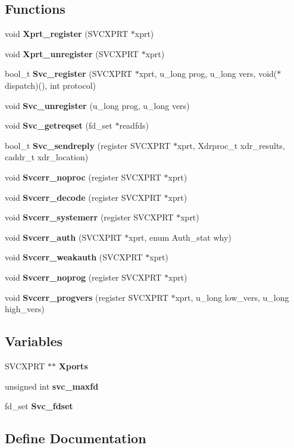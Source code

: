 \subsection*{Functions}
\begin{CompactItemize}
\item 
void {\bf Xprt\_\-register} (SVCXPRT $\ast$xprt)
\item 
void {\bf Xprt\_\-unregister} (SVCXPRT $\ast$xprt)
\item 
bool\_\-t {\bf Svc\_\-register} (SVCXPRT $\ast$xprt, u\_\-long prog, u\_\-long vers, void($\ast$dispatch)(), int protocol)
\item 
void {\bf Svc\_\-unregister} (u\_\-long prog, u\_\-long vers)
\item 
void {\bf Svc\_\-getreqset} (fd\_\-set $\ast$readfds)
\item 
bool\_\-t {\bf Svc\_\-sendreply} (register SVCXPRT $\ast$xprt, Xdrproc\_\-t xdr\_\-results, caddr\_\-t xdr\_\-location)
\item 
void {\bf Svcerr\_\-noproc} (register SVCXPRT $\ast$xprt)
\item 
void {\bf Svcerr\_\-decode} (register SVCXPRT $\ast$xprt)
\item 
void {\bf Svcerr\_\-systemerr} (register SVCXPRT $\ast$xprt)
\item 
void {\bf Svcerr\_\-auth} (SVCXPRT $\ast$xprt, enum Auth\_\-stat why)
\item 
void {\bf Svcerr\_\-weakauth} (SVCXPRT $\ast$xprt)
\item 
void {\bf Svcerr\_\-noprog} (register SVCXPRT $\ast$xprt)
\item 
void {\bf Svcerr\_\-progvers} (register SVCXPRT $\ast$xprt, u\_\-long low\_\-vers, u\_\-long high\_\-vers)
\end{CompactItemize}
\subsection*{Variables}
\begin{CompactItemize}
\item 
SVCXPRT $\ast$$\ast$ {\bf Xports}
\item 
unsigned int {\bf svc\_\-maxfd}
\item 
fd\_\-set {\bf Svc\_\-fdset}
\end{CompactItemize}


\subsection{Define Documentation}
